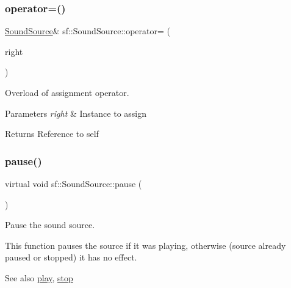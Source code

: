 \subsubsection{\texorpdfstring{operator=()}{operator=()}}
{\footnotesize\ttfamily \mbox{\hyperlink{classsf_1_1_sound_source}{Sound\+Source}}\& sf\+::\+Sound\+Source\+::operator= (\begin{DoxyParamCaption}\item[{const \mbox{\hyperlink{classsf_1_1_sound_source}{Sound\+Source}} \&}]{right }\end{DoxyParamCaption})}



Overload of assignment operator. 


\begin{DoxyParams}{Parameters}
{\em right} & Instance to assign\\
\hline
\end{DoxyParams}
\begin{DoxyReturn}{Returns}
Reference to self \begin{DoxyVerb}\end{DoxyVerb}
 
\end{DoxyReturn}
\mbox{\label{classsf_1_1_sound_source_a21553d4e8fcf136231dd8c7ad4630aba}} 
\subsubsection{\texorpdfstring{pause()}{pause()}}
{\footnotesize\ttfamily virtual void sf\+::\+Sound\+Source\+::pause (\begin{DoxyParamCaption}{ }\end{DoxyParamCaption})\hspace{0.3cm}{\ttfamily [pure virtual]}}



Pause the sound source. 

This function pauses the source if it was playing, otherwise (source already paused or stopped) it has no effect.

\begin{DoxySeeAlso}{See also}
\mbox{\hyperlink{classsf_1_1_sound_source_a6e1bbb1f247ed8743faf3b1ed6f2bc21}{play}}, \mbox{\hyperlink{classsf_1_1_sound_source_a06501a25b12376befcc7ee1ed4865fda}{stop}} \begin{DoxyVerb}\end{DoxyVerb}
 
\end{DoxySeeAlso}


